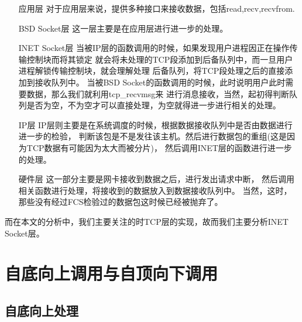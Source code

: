 \begin{enumerate}
\item[应用层]			对于应用层来说，提供多种接口来接收数据，包括read,recv,recvfrom.
\item[BSD Socket层]		这一层主要是在应用层进行进一步的处理。
\item[INET Socket层]		当被IP层的函数调用的时候，如果发现用户进程因正在操作传输控制块而将其锁定
						就会将未处理的TCP段添加到后备队列中，而一旦用户进程解锁传输控制块，就会理解处理
						后备队列，将TCP段处理之后的直接添加到接收队列中。
						当被BSD Socket的函数调用的时候，此时说明用户此时需要数据，那么我们就利用tcp\_recvmsg来
						进行消息接收，当然，起初得判断队列是否为空，不为空才可以直接处理，为空就得进一步进行相关的处理。
\item[IP层]
				IP层则主要是在系统调度的时候，根据数据接收队列中是否由数据进行进一步的检验，
				判断该包是不是发往该主机。然后进行数据包的重组(这是因为TCP数据有可能因为太大而被分片)，
				然后调用INET层的函数进行进一步的处理。
\item[硬件层]     这一部分主要是网卡接收到数据之后，进行发出请求中断，
				  然后调用相关函数进行处理，将接收到的数据放入到数据接收队列中。
					当然，这时，那些没有经过FCS检验过的数据包这时候已经被抛弃了。
\end{enumerate}

		而在本文的分析中，我们主要关注的时TCP层的实现，故而我们主要分析INET Socket层。
	\section{自底向上调用与自顶向下调用}
		\subsection{自底向上处理}
